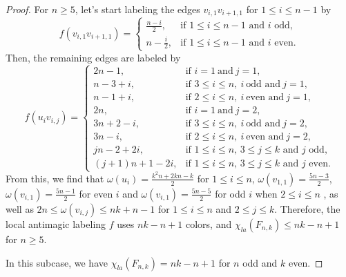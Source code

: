 \documentclass[12pt]{article}
\begin{document}
\begin{proof}
For $n\geq 5$, let's start labeling the edges $v_{i,1}v_{i+1,1}$ for $1\leq i\leq n-1$ by
\begin{equation*}
f(v_{i,1}v_{i+1,1})=\left\{\begin{array}{ll}
\frac{n-i}{2},  &\text{if $1\leq i\leq n-1$~and~$i$~odd},\\[3pt]
n-\frac{i}{2}, &\text{if $1\leq i\leq n-1$~and~$i$~even}.
\end{array}\right.
\end{equation*}
Then, the remaining edges are labeled by
\begin{equation*}
f(u_{i}v_{i,j})=\left\{\begin{array}{ll}
2n-1, &\text{if }i=1~\text{and}~j=1,\\
n-3+i,  &\text{if }3\leq i\leq n,~i~\text{odd~and}~j=1,\\
n-1+i,  &\text{if }2\leq i\leq n,~i~\text{even~and}~j=1,\\
2n, &\text{if }i=1~\text{and}~j=2,\\
3n+2-i,  &\text{if }3\leq i\leq n,~i~\text{odd~and}~j=2,\\
3n-i,    &\text{if }2\leq i\leq n,~i~\text{even~and}~j=2,\\
jn-2+2i, &\text{if $1\leq i\leq n,\,3\leq j\leq k$~and~$j$~odd},\\
(j+1)n+1-2i, &\text{if $1\leq i\leq n,\,3\leq j\leq k$~and~$j$~even}.
\end{array}\right.
\end{equation*}
From this, we find that $\omega(u_{i})=\frac{k^{2}n+2kn-k}{2}$ for $1\leq i\leq n$, $\omega(v_{1,1})=\frac{5n-3}{2}$, $\omega(v_{i,1})=\frac{5n-1}{2}$ for even $i$ and $\omega(v_{i,1})=\frac{5n-5}{2}$ for odd $i$ when $2\leq i\leq n$ , as well as $2n\leq \omega(v_{i,j})\leq nk+n-1$ for $1\leq i\leq n$ and $2\leq j\leq k$. Therefore, the local antimagic labeling $f$ uses $nk-n+1$ colors, and $\chi_{la}(F_{n,k})\leq nk-n+1$ for $n\geq 5$.

In this subcase, we have $\chi_{la}(F_{n,k})=nk-n+1$ for $n$ odd and $k$ even.


\end{proof}
\end{document}
